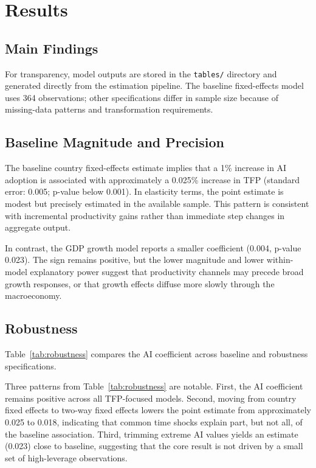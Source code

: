 \section{Results}

\subsection{Main Findings}


For transparency, model outputs are stored in the \texttt{tables/} directory and generated directly from the estimation pipeline. The baseline fixed-effects model uses 364 observations; other specifications differ in sample size because of missing-data patterns and transformation requirements.

\subsection{Baseline Magnitude and Precision}

The baseline country fixed-effects estimate implies that a 1\% increase in AI adoption is associated with approximately a 0.025\% increase in TFP (standard error: 0.005; p-value below 0.001). In elasticity terms, the point estimate is modest but precisely estimated in the available sample. This pattern is consistent with incremental productivity gains rather than immediate step changes in aggregate output.

In contrast, the GDP growth model reports a smaller coefficient (0.004, p-value 0.023). The sign remains positive, but the lower magnitude and lower within-model explanatory power suggest that productivity channels may precede broad growth responses, or that growth effects diffuse more slowly through the macroeconomy.

\subsection{Robustness}
Table~\ref{tab:robustness} compares the AI coefficient across baseline and robustness specifications.

\begin{table}[h!]
\centering
\caption{Robustness Summary Across Model Specifications}
\label{tab:robustness}

\end{table}

Three patterns from Table~\ref{tab:robustness} are notable. First, the AI coefficient remains positive across all TFP-focused models. Second, moving from country fixed effects to two-way fixed effects lowers the point estimate from approximately 0.025 to 0.018, indicating that common time shocks explain part, but not all, of the baseline association. Third, trimming extreme AI values yields an estimate (0.023) close to baseline, suggesting that the core result is not driven by a small set of high-leverage observations.

